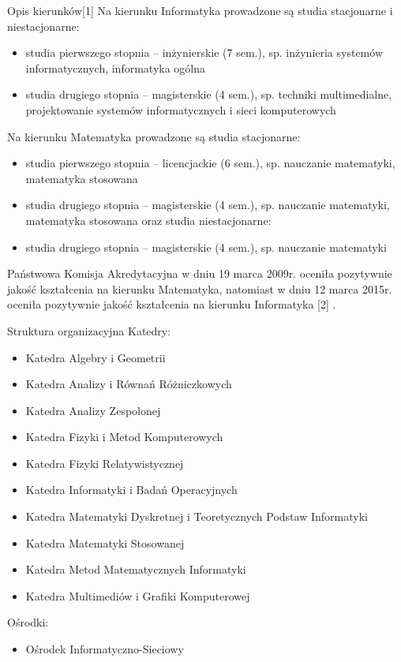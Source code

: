 \documentclass[a4paper,12pt]{article}
\begin{document}
Opis kierunków[1]
Na kierunku Informatyka prowadzone są studia stacjonarne i niestacjonarne:
\begin{itemize}
\item studia pierwszego stopnia – inżynierskie (7 sem.), sp. inżynieria systemów informatycznych, informatyka
ogólna
\item studia drugiego stopnia – magisterskie (4 sem.), sp. techniki multimedialne, projektowanie systemów
informatycznych i sieci komputerowych
\end{itemize}

Na kierunku Matematyka prowadzone są studia stacjonarne:
\begin{itemize}
\item studia pierwszego stopnia – licencjackie (6 sem.), sp. nauczanie matematyki, matematyka stosowana
\item studia drugiego stopnia – magisterskie (4 sem.), sp. nauczanie matematyki, matematyka stosowana
oraz studia niestacjonarne:
\item studia drugiego stopnia – magisterskie (4 sem.), sp. nauczanie matematyki
\end{itemize}
Państwowa Komisja Akredytacyjna w dniu 19 marca 2009r. oceniła pozytywnie jakość kształcenia na kierunku
Matematyka, natomiast w dniu 12 marca 2015r. oceniła pozytywnie jakość kształcenia na kierunku
Informatyka [2]
.



Struktura organizacyjna
Katedry:
\begin{itemize}
\item Katedra Algebry i Geometrii
\item Katedra Analizy i Równań Różniczkowych
\item Katedra Analizy Zespolonej
\item Katedra Fizyki i Metod Komputerowych
\item Katedra Fizyki Relatywistycznej
\item Katedra Informatyki i Badań Operacyjnych
\item Katedra Matematyki Dyskretnej i Teoretycznych Podstaw Informatyki
\item Katedra Matematyki Stosowanej
\item Katedra Metod Matematycznych Informatyki
\item Katedra Multimediów i Grafiki Komputerowej
\end{itemize}

Ośrodki:
\begin{itemize}
\item Ośrodek Informatyczno-Sieciowy
\end{itemize}
\end{document}

